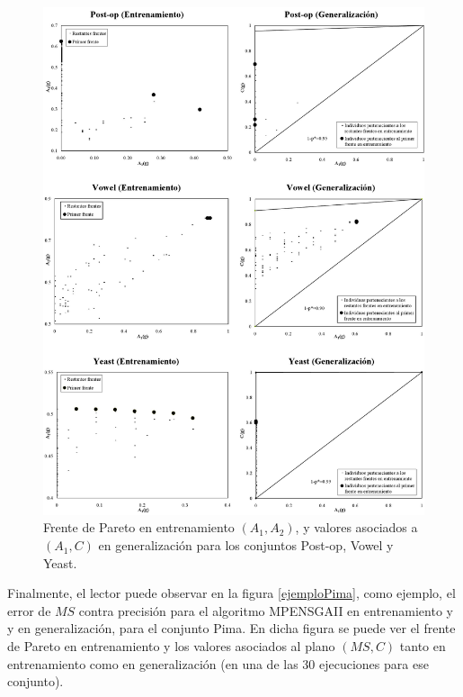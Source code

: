 \begin{figure}[!htb]
\centering
	\includegraphics[keepaspectratio,width=13cm]{figuras/tanda6.jpg}
\caption{Frente de Pareto en entrenamiento $(A_{1},A_{2})$, y valores asociados a
$(A_{1},C)$ en generalización para los conjuntos Post-op, Vowel y Yeast.}
\label{tanda6}
\end{figure}

\clearpage
Finalmente, el lector puede observar en la figura \ref{ejemploPima}, como ejemplo, el
error
de $MS$ contra precisión para el algoritmo MPENSGAII en entrenamiento y
y en generalización, para el conjunto Pima. En dicha figura se puede ver
el frente de Pareto en entrenamiento y los valores asociados al plano $(MS,C)$ tanto en
entrenamiento como en generalización (en una de las 30 ejecuciones para ese
conjunto).

